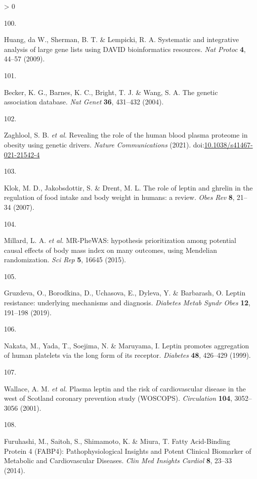 \documentclass[11pt,twoside]{bristolthesis}
\newlength{\cslhangindent}
\newlength{\csllabelwidth}
\newenvironment{CSLReferences}[2] %
 {%
  \setlength{\parindent}{0pt}
  \ifodd #1 \everypar{\setlength{\hangindent}{\cslhangindent}}\ignorespaces\fi
  \ifnum #2 > 0
  \setlength{\parskip}{#2\baselineskip}
  \fi
 }%
 {}
\newcommand{\CSLLeftMargin}[1]{\parbox[t]{\csllabelwidth}{#1}}
\newcommand{\CSLRightInline}[1]{\parbox[t]{\linewidth - \csllabelwidth}{#1}\break}
\begin{document}
\begin{CSLReferences}{0}{0}
\leavevmode\hypertarget{ref-Huang2009}{}%
\CSLLeftMargin{100. }
\CSLRightInline{Huang, da W., Sherman, B. T. \& Lempicki, R. A. {Systematic and integrative analysis of large gene lists using DAVID bioinformatics resources}. \emph{Nat Protoc} \textbf{4}, 44--57 (2009).}

\leavevmode\hypertarget{ref-Becker2004a}{}%
\CSLLeftMargin{101. }
\CSLRightInline{Becker, K. G., Barnes, K. C., Bright, T. J. \& Wang, S. A. {The genetic association database}. \emph{Nat Genet} \textbf{36}, 431--432 (2004).}

\leavevmode\hypertarget{ref-Zaghlool2021}{}%
\CSLLeftMargin{102. }
\CSLRightInline{Zaghlool, S. B. \emph{et al.} {Revealing the role of the human blood plasma proteome in obesity using genetic drivers}. \emph{Nature Communications} (2021). doi:\href{https://doi.org/10.1038/s41467-021-21542-4}{10.1038/s41467-021-21542-4}}

\leavevmode\hypertarget{ref-Klok2007}{}%
\CSLLeftMargin{103. }
\CSLRightInline{Klok, M. D., Jakobsdottir, S. \& Drent, M. L. {The role of leptin and ghrelin in the regulation of food intake and body weight in humans: a review}. \emph{Obes Rev} \textbf{8}, 21--34 (2007).}

\leavevmode\hypertarget{ref-Millard2015}{}%
\CSLLeftMargin{104. }
\CSLRightInline{Millard, L. A. \emph{et al.} {MR-PheWAS: hypothesis prioritization among potential causal effects of body mass index on many outcomes, using Mendelian randomization}. \emph{Sci Rep} \textbf{5}, 16645 (2015).}

\leavevmode\hypertarget{ref-Gruzdeva2019a}{}%
\CSLLeftMargin{105. }
\CSLRightInline{Gruzdeva, O., Borodkina, D., Uchasova, E., Dyleva, Y. \& Barbarash, O. {Leptin resistance: underlying mechanisms and diagnosis}. \emph{Diabetes Metab Syndr Obes} \textbf{12}, 191--198 (2019).}

\leavevmode\hypertarget{ref-Nakata1999}{}%
\CSLLeftMargin{106. }
\CSLRightInline{Nakata, M., Yada, T., Soejima, N. \& Maruyama, I. {Leptin promotes aggregation of human platelets via the long form of its receptor}. \emph{Diabetes} \textbf{48}, 426--429 (1999).}

\leavevmode\hypertarget{ref-Wallace2001}{}%
\CSLLeftMargin{107. }
\CSLRightInline{Wallace, A. M. \emph{et al.} {Plasma leptin and the risk of cardiovascular disease in the west of Scotland coronary prevention study (WOSCOPS)}. \emph{Circulation} \textbf{104}, 3052--3056 (2001).}

\leavevmode\hypertarget{ref-Furuhashi2014}{}%
\CSLLeftMargin{108. }
\CSLRightInline{Furuhashi, M., Saitoh, S., Shimamoto, K. \& Miura, T. {Fatty Acid-Binding Protein 4 (FABP4): Pathophysiological Insights and Potent Clinical Biomarker of Metabolic and Cardiovascular Diseases}. \emph{Clin Med Insights Cardiol} \textbf{8}, 23--33 (2014).}


\end{CSLReferences}
\end{document}
